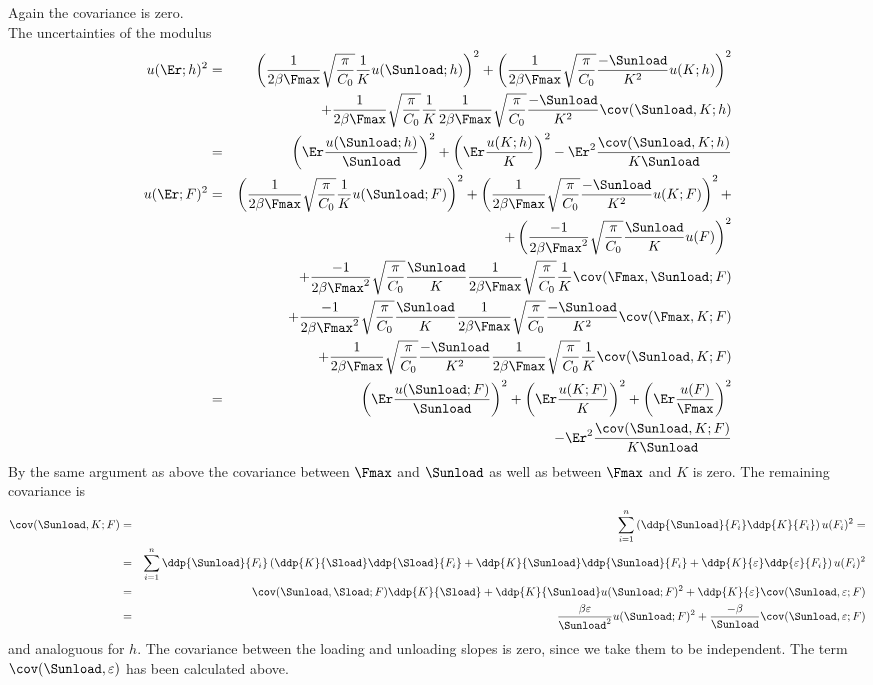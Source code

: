 Again the covariance is zero. \\
The uncertainties of the modulus 
\begin{eqnarray*}
 u(\Er;h)^2 &=& \left(\frac1{2 \beta \Fmax}  \sqrt{\frac \pi{C_0}} \frac1{K} u(\Sunload;h)  \right)^2  +  \left(\frac1{2 \beta \Fmax}  \sqrt{\frac \pi{C_0}} \frac{-\Sunload}{K^2} u(K;h)  \right)^2 \\
 &&  + \frac1{2 \beta \Fmax}  \sqrt{\frac \pi{C_0}} \frac1{K}  \frac1{2 \beta \Fmax}  \sqrt{\frac \pi{C_0}} \frac{-\Sunload}{K^2}   \cov(\Sunload, K; h) \\
  &=& \left( \Er \frac{u(\Sunload;h)}{\Sunload}  \right)^2  +  \left( \Er \frac{u(K;h)}{K}  \right)^2 -\Er^2 \frac{\cov(\Sunload,K;h)}{K\Sunload} \\ 
 u(\Er;F)^2 &=& \left(\frac1{2 \beta \Fmax}  \sqrt{\frac \pi{C_0}} \frac1{K} u(\Sunload;F)  \right)^2  +  \left(\frac1{2 \beta \Fmax}  \sqrt{\frac \pi{C_0}} \frac{-\Sunload}{K^2} u(K;F)  \right)^2 + \\
 &&+  \left( \frac{-1}{2 \beta \Fmax^2} \sqrt{\frac \pi{C_0}} \frac{\Sunload}{K} u(F) \right)^2 \\
&& + \frac{-1}{2 \beta \Fmax^2} \sqrt{\frac \pi{C_0}} \frac{\Sunload}{K} \frac1{2 \beta \Fmax}  \sqrt{\frac \pi{C_0}} \frac1{K}\cov(\Fmax, \Sunload;F) \\
&& + \frac{-1}{2 \beta \Fmax^2} \sqrt{\frac \pi{C_0}} \frac{\Sunload}{K}\frac1{2 \beta \Fmax}  \sqrt{\frac \pi{C_0}} \frac{-\Sunload}{K^2} \cov(\Fmax, K;F)\\
&& + \frac1{2 \beta \Fmax}  \sqrt{\frac \pi{C_0}} \frac{-\Sunload}{K^2}\frac1{2 \beta \Fmax}  \sqrt{\frac \pi{C_0}} \frac1{K}\cov(\Sunload,K;F) \\
%
&=& \left( \Er \frac{u(\Sunload;F)}{\Sunload}  \right)^2  +  \left( \Er \frac{u(K;F)}{K}  \right)^2 + \left( \Er \frac{u(F)}{\Fmax} \right)^2 \\
&& - \Er^2 \frac{\cov(\Sunload,K;F)}{K\Sunload}
\end{eqnarray*}
By the same argument as above the covariance between $\Fmax$ and $\Sunload$ as well as between $\Fmax$ and $K$ is zero.
The remaining covariance is
\begin{eqnarray*}
 \cov(\Sunload,K;F) &=&  \sum_{i=1}^n \left( \ddp{\Sunload}{F_i} \ddp{K}{F_i} \right) u({F_i})^2 = \\
&=& \sum_{i=1}^n  \ddp{\Sunload}{F_i} \left( \ddp{K}{\Sload} \ddp{\Sload}{F_i} + \ddp{K}{\Sunload} \ddp{\Sunload}{F_i} + \ddp{K}{\varepsilon} \ddp{\varepsilon}{F_i} \right) u({F_i})^2 \\
&=& \cov(\Sunload,\Sload;F) \ddp{K}{\Sload} + \ddp{K}{\Sunload} u(\Sunload;F)^2 + \ddp{K}{\varepsilon} \cov(\Sunload, \varepsilon;F) \\
&=& \frac{\beta \varepsilon}{\Sunload^2} u(\Sunload;F)^2 + \frac{-\beta}{\Sunload} \cov(\Sunload, \varepsilon;F)
\end{eqnarray*}
and analoguous for $h$. The covariance between the loading and unloading slopes is zero, since we take them to be independent. The term $\cov(\Sunload, \varepsilon)$ has been calculated above.\\
